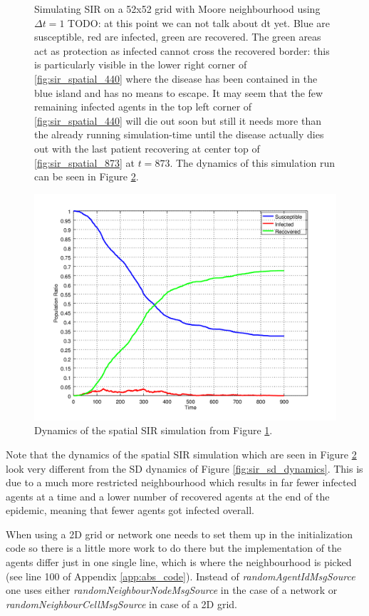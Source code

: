 \begin{figure}
\begin{center}
	\caption{Simulating SIR on a 52x52 grid with Moore neighbourhood using $\Delta t = 1$ TODO: at this point we can not talk about dt yet. Blue are susceptible, red are infected, green are recovered. The green areas act as protection as infected cannot cross the recovered border: this is particularly visible in the lower right corner of \ref{fig:sir_spatial_440} where the disease has been contained in the blue island and has no means to escape. It may seem that the few remaining infected agents in the top left corner of \ref{fig:sir_spatial_440} will die out soon but still it needs more than the already running simulation-time until the disease actually dies out with the last patient recovering at center top of \ref{fig:sir_spatial_873} at $t = 873$. The dynamics of this simulation run can be seen in Figure \ref{fig:sir_spatial_dynamics}.} 
	\label{fig:sir_spatial}
\end{center}
\end{figure}

\begin{figure}
	\centering
	\includegraphics[width=.6\textwidth, angle=0]{./../shared/fig/spatial/SIR_spatial_dynamics_52x52_900time_1dt_parallel.png}
	\caption{Dynamics of the spatial SIR simulation from Figure \ref{fig:sir_spatial}.}
	\label{fig:sir_spatial_dynamics}
\end{figure}

Note that the dynamics of the spatial SIR simulation which are seen in Figure \ref{fig:sir_spatial_dynamics} look very different from the SD dynamics of Figure \ref{fig:sir_sd_dynamics}. This is due to a much more restricted neighbourhood which results in far fewer infected agents at a time and a lower number of recovered agents at the end of the epidemic, meaning that fewer agents got infected overall.

When using a 2D grid or network one needs to set them up in the initialization code so there is a little more work to do there but the implementation of the agents differ just in one single line, which is where the neighbourhood is picked (see line 100 of Appendix \ref{app:abs_code}). Instead of \textit{randomAgentIdMsgSource} one uses either \textit{randomNeighbourNodeMsgSource} in the case of a network or \textit{randomNeighbourCellMsgSource} in case of a 2D grid.